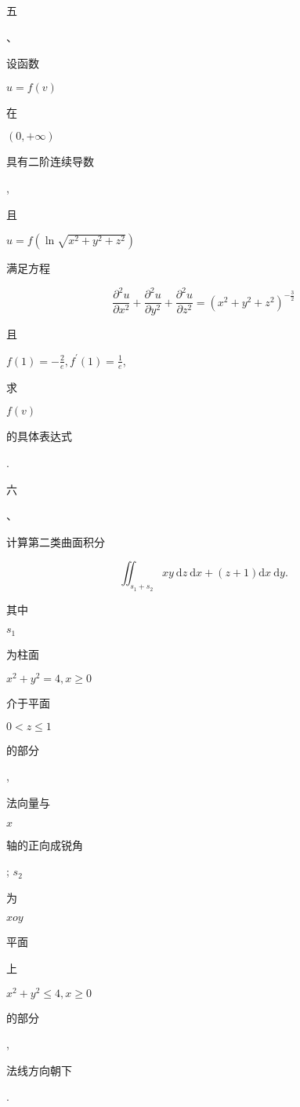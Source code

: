 \documentclass[10pt]{article}
\begin{document}
\begin{CJK}{UTF8}{mj}五\end{CJK}、\begin{CJK}{UTF8}{mj}设函数\end{CJK} $u=f(v)$ \begin{CJK}{UTF8}{mj}在\end{CJK} $(0,+\infty)$ \begin{CJK}{UTF8}{mj}具有二阶连续导数\end{CJK}, \begin{CJK}{UTF8}{mj}且\end{CJK} $u=f\left(\ln \sqrt{x^{2}+y^{2}+z^{2}}\right)$ \begin{CJK}{UTF8}{mj}满足方程\end{CJK}
$$
\frac{\partial^{2} u}{\partial x^{2}}+\frac{\partial^{2} u}{\partial y^{2}}+\frac{\partial^{2} u}{\partial z^{2}}=\left(x^{2}+y^{2}+z^{2}\right)^{-\frac{3}{2}}
$$
\begin{CJK}{UTF8}{mj}且\end{CJK} $f(1)=-\frac{2}{e}, f^{\prime}(1)=\frac{1}{e}$, \begin{CJK}{UTF8}{mj}求\end{CJK} $f(v)$ \begin{CJK}{UTF8}{mj}的具体表达式\end{CJK}.

\begin{CJK}{UTF8}{mj}六\end{CJK}、\begin{CJK}{UTF8}{mj}计算第二类曲面积分\end{CJK}
$$
\iint_{s_{1}+s_{2}} x y \mathrm{~d} z \mathrm{~d} x+(z+1) \mathrm{d} x \mathrm{~d} y .
$$
\begin{CJK}{UTF8}{mj}其中\end{CJK} $s_{1}$ \begin{CJK}{UTF8}{mj}为柱面\end{CJK} $x^{2}+y^{2}=4, x \geqslant 0$ \begin{CJK}{UTF8}{mj}介于平面\end{CJK} $0<z \leqslant 1$ \begin{CJK}{UTF8}{mj}的部分\end{CJK}, \begin{CJK}{UTF8}{mj}法向量与\end{CJK} $x$ \begin{CJK}{UTF8}{mj}轴的正向成锐角\end{CJK}; $s_{2}$ \begin{CJK}{UTF8}{mj}为\end{CJK} $x o y$ \begin{CJK}{UTF8}{mj}平面\end{CJK} \begin{CJK}{UTF8}{mj}上\end{CJK} $x^{2}+y^{2} \leqslant 4, x \geqslant 0$ \begin{CJK}{UTF8}{mj}的部分\end{CJK}, \begin{CJK}{UTF8}{mj}法线方向朝下\end{CJK}.
\end{document}
